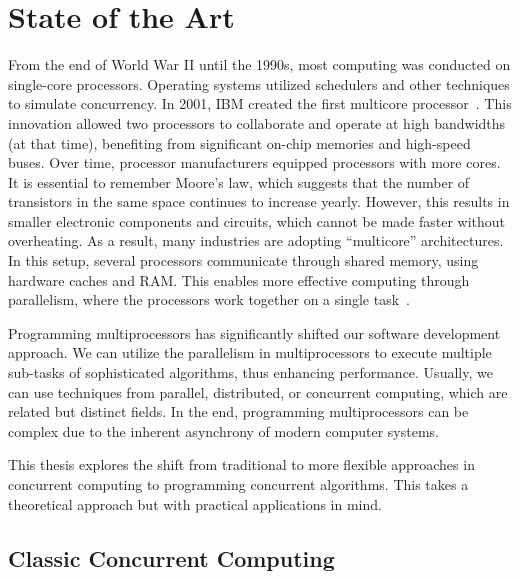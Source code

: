 \chapter{\label{chapter:2_State_of_art}State of the Art}

From the end of World War II until the 1990s, most computing was conducted on single-core processors. Operating systems utilized schedulers and other techniques to simulate concurrency. In 2001, IBM created the first multicore processor~\cite{ibmIBM100Power}. This innovation allowed two processors to collaborate and operate at high bandwidths (at that time), benefiting from significant on-chip memories and high-speed buses. Over time, processor manufacturers equipped processors with more cores. It is essential to remember Moore's law, which suggests that the number of transistors in the same space continues to increase yearly. However, this results in smaller electronic components and circuits, which cannot be made faster without overheating. As a result, many industries are adopting ``multicore'' architectures. In this setup, several processors communicate through shared memory, using hardware caches and RAM. This enables more effective computing through parallelism, where the processors work together on a single task~\cite{DBLP_books_daglib_0020056}.

Programming multiprocessors has significantly shifted our software development approach. We can utilize the parallelism in multiprocessors to execute multiple sub-tasks of sophisticated algorithms, thus enhancing performance. Usually, we can use techniques from parallel, distributed, or concurrent computing, which are related but distinct fields. In the end, programming multiprocessors can be complex due to the inherent asynchrony of modern computer systems.

This thesis explores the shift from traditional to more flexible approaches in concurrent computing to programming concurrent algorithms. This takes a theoretical approach but with practical applications in mind.

\section{\label{section:classic-concurrent}Classic Concurrent Computing}

